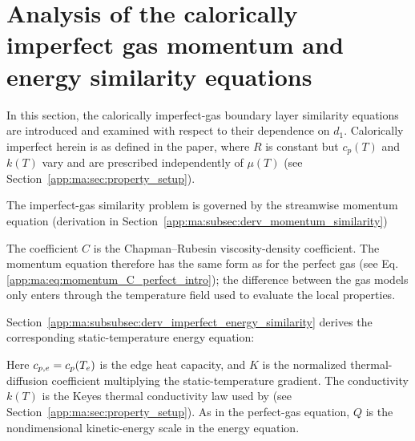 \section{Analysis of the calorically imperfect gas momentum and energy similarity equations}
\label{app:ma:sec:imperfect_gas_similarity}
In this section, the calorically imperfect-gas boundary layer similarity equations are introduced and examined with respect to their dependence on \(d_1\). Calorically imperfect herein is as defined in the \maAppName{} paper, where \(R\) is constant but \(c_p(T)\) and \(k(T)\) vary and are prescribed independently of \(\mu(T)\) (see Section~\ref{app:ma:sec:property_setup}).

The imperfect-gas similarity problem is governed by the streamwise momentum equation (derivation in Section~\ref{app:ma:subsec:derv_momentum_similarity})


The coefficient \(C\) is the Chapman--Rubesin viscosity-density coefficient. The momentum equation therefore has the same form as for the perfect gas (see Eq. \eqref{app:ma:eq:momentum_C_perfect_intro}); the difference between the gas models only enters through the temperature field used to evaluate the local properties.

Section~\ref{app:ma:subsubsec:derv_imperfect_energy_similarity} derives the corresponding static-temperature energy equation:


Here \(c_{p,e}=c_p(T_e)\) is the edge heat capacity, and \(K\) is the normalized thermal-diffusion coefficient multiplying the static-temperature gradient. The conductivity \(k(T)\) is the Keyes thermal conductivity law used by \maAppName{} (see Section~\ref{app:ma:sec:property_setup}). As in the perfect-gas equation, \(Q\) is the nondimensional kinetic-energy scale in the energy equation.

